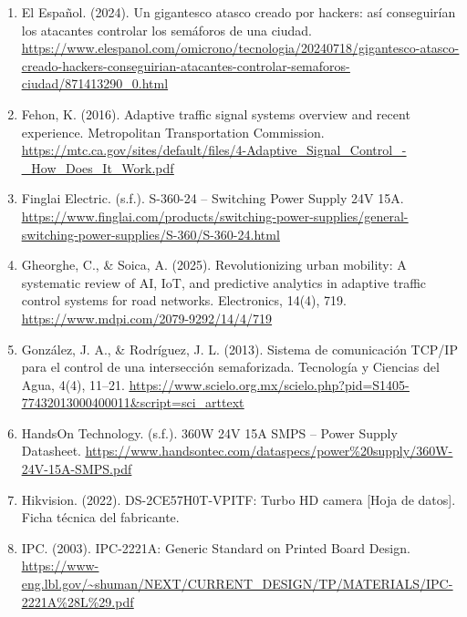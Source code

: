\documentclass[12pt,a4paper,oneside]{report}
\providecommand{\ul}[1]{\underline{#1}}
\begin{document}
\begin{enumerate}
\item
  El Español. (2024). Un gigantesco atasco creado por hackers: así conseguirían los atacantes controlar los semáforos de una ciudad. \href{https://www.elespanol.com/omicrono/tecnologia/20240718/gigantesco-atasco-creado-hackers-conseguirian-atacantes-controlar-semaforos-ciudad/871413290_0.html}{\ul{https://www.elespanol.com/omicrono/tecnologia/20240718/gigantesco-atasco-creado-hackers-conseguirian-atacantes-controlar-semaforos-ciudad/871413290\_0.html}}
\item
  Fehon, K. (2016). Adaptive traffic signal systems overview and recent experience. Metropolitan Transportation Commission. \href{https://mtc.ca.gov/sites/default/files/4-Adaptive_Signal_Control_-_How_Does_It_Work.pdf}{\ul{https://mtc.ca.gov/sites/default/files/4-Adaptive\_Signal\_Control\_-\_How\_Does\_It\_Work.pdf}}
\item
  Finglai Electric. (s.f.). S-360-24 -- Switching Power Supply 24V 15A. \href{https://www.finglai.com/products/switching-power-supplies/general-switching-power-supplies/S-360/S-360-24.html}{\ul{https://www.finglai.com/products/switching-power-supplies/general-switching-power-supplies/S-360/S-360-24.html}}
\item
  Gheorghe, C., \& Soica, A. (2025). Revolutionizing urban mobility: A systematic review of AI, IoT, and predictive analytics in adaptive traffic control systems for road networks. Electronics, 14(4), 719. \href{https://www.mdpi.com/2079-9292/14/4/719}{\ul{https://www.mdpi.com/2079-9292/14/4/719}}
\item
  González, J. A., \& Rodríguez, J. L. (2013). Sistema de comunicación TCP/IP para el control de una intersección semaforizada. Tecnología y Ciencias del Agua, 4(4), 11--21. \href{https://www.scielo.org.mx/scielo.php?pid=S1405-77432013000400011&script=sci_arttext}{\ul{https://www.scielo.org.mx/scielo.php?pid=S1405-77432013000400011\&script=sci\_arttext}}
\item
  HandsOn Technology. (s.f.). 360W 24V 15A SMPS -- Power Supply Datasheet. \href{https://www.handsontec.com/dataspecs/power\%20supply/360W-24V-15A-SMPS.pdf}{\ul{https://www.handsontec.com/dataspecs/power\%20supply/360W-24V-15A-SMPS.pdf}}
\item
  Hikvision. (2022). DS-2CE57H0T-VPITF: Turbo HD camera {[}Hoja de datos{]}. Ficha técnica del fabricante.
\item
  IPC. (2003). IPC-2221A: Generic Standard on Printed Board Design. \href{https://www-eng.lbl.gov/~shuman/NEXT/CURRENT_DESIGN/TP/MATERIALS/IPC-2221A\%28L\%29.pdf}{\ul{https://www-eng.lbl.gov/\textasciitilde shuman/NEXT/CURRENT\_DESIGN/TP/MATERIALS/IPC-2221A\%28L\%29.pdf}}

\end{enumerate}
\end{document}
